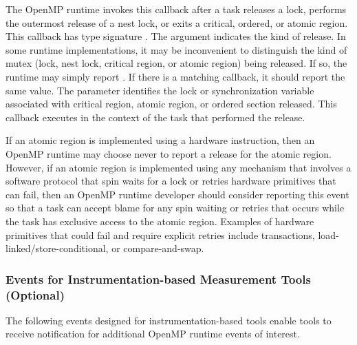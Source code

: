 \documentclass{article}
\newcommand{\descheader}[1]{{\needspace{3\baselineskip}\vspace{1em}\noindent \fbox{#1}}}
\begin{document}
\begin{description}

\item {} 

   The OpenMP runtime invokes this callback after a task releases a lock, performs the outermost release of a nest lock, or exits a critical, ordered, 
   or atomic region. 
   This callback has type signature . 
   The argument  indicates the kind of release. In some runtime implementations, it may be inconvenient to distinguish the kind of mutex (lock, nest lock, 
   critical region, or atomic region) being released. If so, the runtime may simply report . If there is a matching 
    callback, it should report the same  value. 
   The  parameter identifies the lock or synchronization variable
   associated with critical region, atomic region, or ordered section released. This callback executes in the context of the task that performed the release. 
   
   If an atomic region is implemented using a hardware instruction, then an OpenMP runtime may choose never to report a release for the atomic region. 
   However, if an atomic region is implemented  using any mechanism that involves a software protocol that spin waits for a lock or retries hardware primitives
   that can fail, then an OpenMP 
   runtime developer should consider reporting this event so that a task can accept blame for any spin waiting or retries that occurs while the task has 
   exclusive access to the atomic region.
   Examples of hardware primitives that could fail and require explicit retries include transactions,  
   load-linked/store-conditional, or compare-and-swap.
   
\end{description}

\subsubsection{Events for Instrumentation-based Measurement Tools (Optional)}
\label{sec:trace-events}

The following events designed for instrumentation-based tools enable tools to receive notification for additional OpenMP runtime events of interest.

\descheader{Tasking}
\end{document}
